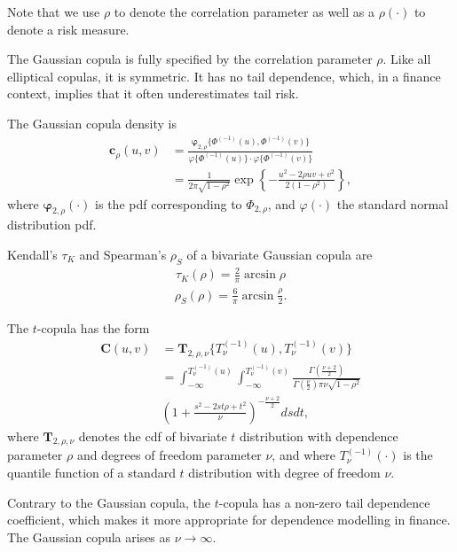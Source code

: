 Note that we use $\rho$ to denote the correlation parameter as well as a $\rho(\cdot)$ to denote a risk measure. \medskip

The Gaussian copula is fully specified by the correlation parameter $\rho$.
Like all elliptical copulas, it is symmetric.
It has no tail dependence, which, in a finance context, implies that it often underestimates tail risk. \medskip

The Gaussian copula density is
\begin{align}
  \bm{c}_\rho(u,v) &= \frac{\bm{\varphi}_{2,\rho}\{\Phi^{(-1)}(u), \Phi^{(-1)}(v)\}}
                     {\varphi\{\Phi^{(-1)}(u)\} \cdot \varphi\{\Phi^{(-1)}(v)\}} \nonumber \\[10pt]
                   &= \frac{1}{2\pi\sqrt{1-\rho^2}}\exp\left\{
                     -\frac{u^2 - 2\rho uv + v^2}{2(1-\rho^2)}
                     \right\},
\end{align}
where $\bm{\varphi}_{2,\rho}(\cdot)$ is the pdf corresponding to
$\Phi_{2, \rho}$, and $\varphi(\cdot)$ the standard normal
distribution pdf. \medskip

Kendall's $\tau_K$ and Spearman's $\rho_S$ of a bivariate Gaussian copula are
    \begin{align}
        \tau_K(\rho) = \frac{2}{\pi}\arcsin\rho
        \end{align}
    \begin{align}
        \rho_S(\rho) = \frac{6}{\pi}\arcsin\frac{\rho}{2}.
        \end{align}

The $t$-copula has the form
\begin{align*}
        \bm{C}(u,v) &= \bm{T}_{2, \rho, \nu}\{T^{(-1)}_\nu(u), T^{(-1)}_\nu(v)\} \nonumber \\[10pt]
            &= \int_{-\infty}^{T^{(-1)}_\nu(u)}
               \int_{-\infty}^{T^{(-1)}_\nu(v)}
            \frac{\Gamma\left(\frac{\nu+2}{2}\right)}
            {\Gamma\left(\frac{\nu}{2}\right)\pi\nu\sqrt{1-\rho^2}}\\[10pt]
           & \left(
        1+\frac{s^2-2st\rho+t^2}{\nu}
        \right)^{-\frac{\nu+2}{2}} ds dt,
    \end{align*}
where $\bm{T}_{2, \rho, \nu}$ denotes the cdf of
bivariate $t$ distribution with dependence parameter $\rho$ and degrees of freedom parameter $\nu$,
and where $T^{(-1)}_\nu(\cdot)$ is the quantile function of a standard
$t$ distribution with degree of freedom $\nu$. \medskip

Contrary to the Gaussian copula, the $t$-copula has a non-zero
tail dependence coefficient, which makes it more appropriate for
dependence modelling in finance. The Gaussian copula arises as
$\nu\rightarrow\infty$.

